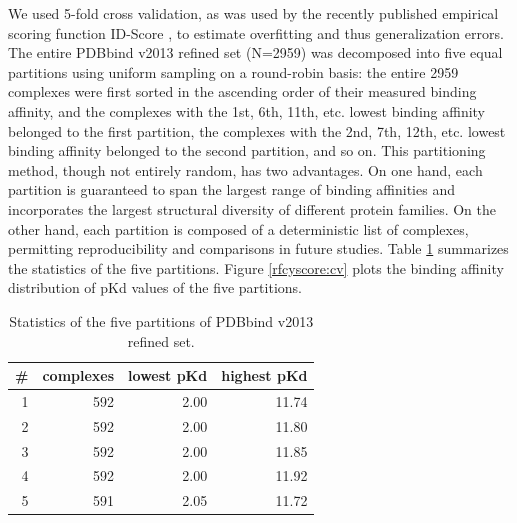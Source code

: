 We used 5-fold cross validation, as was used by the recently published empirical scoring function ID-Score \citep{1305}, to estimate overfitting and thus generalization errors. The entire PDBbind v2013 refined set (N=2959) was decomposed into five equal partitions using uniform sampling on a round-robin basis: the entire 2959 complexes were first sorted in the ascending order of their measured binding affinity, and the complexes with the 1st, 6th, 11th, etc. lowest binding affinity belonged to the first partition, the complexes with the 2nd, 7th, 12th, etc. lowest binding affinity belonged to the second partition, and so on. This partitioning method, though not entirely random, has two advantages. On one hand, each partition is guaranteed to span the largest range of binding affinities and incorporates the largest structural diversity of different protein families. On the other hand, each partition is composed of a deterministic list of complexes, permitting reproducibility and comparisons in future studies. Table \ref{rfcyscore:partitions} summarizes the statistics of the five partitions. Figure \ref{rfcyscore:cv} plots the binding affinity distribution of pKd values of the five partitions.

\begin{table}
\caption{Statistics of the five partitions of PDBbind v2013 refined set.}
\label{rfcyscore:partitions}
\begin{tabular}{rrrr}
\hline
\# & complexes & lowest pKd & highest pKd\\
\hline
1 & 592 & 2.00 & 11.74\\
2 & 592 & 2.00 & 11.80\\
3 & 592 & 2.00 & 11.85\\
4 & 592 & 2.00 & 11.92\\
5 & 591 & 2.05 & 11.72\\
\hline
\end{tabular}
\end{table}

